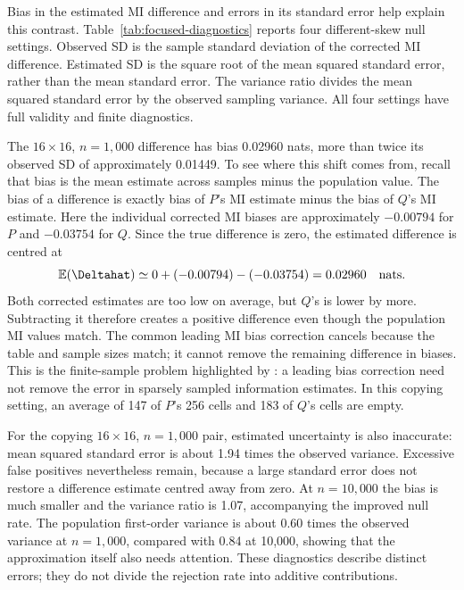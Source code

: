 Bias in the estimated MI difference and errors in its standard error help
explain this contrast.
Table~\ref{tab:focused-diagnostics} reports four
different-skew null settings. Observed SD is the sample standard deviation
of the corrected MI difference. Estimated SD is the square root of the
mean squared standard error, rather than the mean standard error. The
variance ratio divides the mean squared standard error by the observed
sampling variance. All four settings have full validity and finite diagnostics.

\begin{table}[htbp]
\centering
\small
\caption{Bias and uncertainty of the estimated MI difference.}
\label{tab:focused-diagnostics}

\end{table}

The \(16\times16\), \(n=1{,}000\) difference has bias 0.02960 nats,
more than twice its observed SD of approximately 0.01449. To see where
this shift comes from, recall that bias is the mean estimate across
samples minus the population value. The bias of a difference is exactly
bias of \(P\)'s MI estimate minus the bias of \(Q\)'s MI estimate. Here the
individual corrected MI biases are approximately \(-0.00794\) for \(P\)
and \(-0.03754\) for \(Q\). Since the true difference is zero, the
estimated difference is centred at
\begin{equation}
 \mathbb{E}(\Deltahat)
 \simeq 0+(-0.00794)-(-0.03754)=0.02960
 \quad\text{nats}.
 \label{eq:focused-null-bias-shift}
\end{equation}
Both corrected estimates are too low on average, but \(Q\)'s is lower
by more. Subtracting it therefore creates a positive difference even
though the population MI values match. The common leading MI bias correction
cancels because the table and sample sizes match; it cannot remove the
remaining difference in biases. This is the finite-sample problem
highlighted by \citet{paninski2003}: a leading bias correction need not
remove the error in sparsely sampled information estimates. In this
copying setting, an average of 147 of \(P\)'s 256 cells and 183 of
\(Q\)'s cells are empty.

For the copying \(16\times16\), \(n=1{,}000\) pair, estimated uncertainty
is also inaccurate: mean squared standard error is about 1.94 times the
observed variance. Excessive false
positives nevertheless remain, because a large standard error does not
restore a difference estimate centred away from zero. At \(n=10{,}000\)
the bias is much smaller and the variance ratio is 1.07, accompanying
the improved null rate. The population first-order variance is about
0.60 times the observed variance at \(n=1{,}000\), compared with 0.84
at 10,000, showing that the approximation itself also needs attention.
These diagnostics describe distinct errors; they do not divide the
rejection rate into additive contributions.

